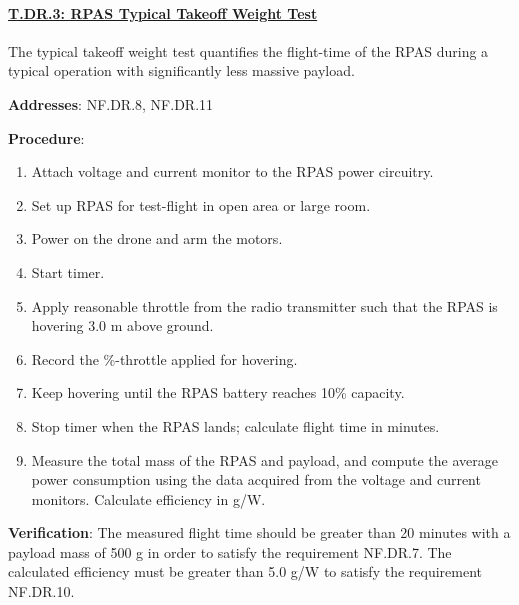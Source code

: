 \paragraph{\underline{T.DR.3: RPAS Typical Takeoff Weight Test}}

The typical takeoff weight test quantifies the flight-time of the RPAS during a typical operation with significantly less massive payload.

\textbf{Addresses}: NF.DR.8, NF.DR.11

\textbf{Procedure}:
\begin{enumerate}[noitemsep]
    \item Attach voltage and current monitor to the RPAS power circuitry.
    \item Set up RPAS for test-flight in open area or large room.
    \item Power on the drone and arm the motors.
    \item Start timer.
    \item Apply reasonable throttle from the radio transmitter such that the RPAS is hovering 3.0 m above ground.
    \item Record the \%-throttle applied for hovering.
    \item Keep hovering until the RPAS battery reaches 10\% capacity.
    \item Stop timer when the RPAS lands; calculate flight time in minutes.
    \item Measure the total mass of the RPAS and payload, and compute the average power consumption using the data acquired from the voltage and current monitors. Calculate efficiency in g/W.
\end{enumerate}

\textbf{Verification}:
The measured flight time should be greater than 20 minutes with a payload mass of 500 g in order to satisfy the requirement NF.DR.7. The calculated efficiency must be greater than 5.0 g/W to satisfy the requirement NF.DR.10.